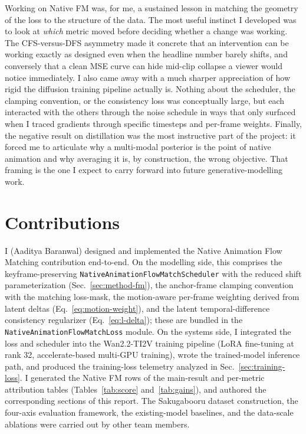 \documentclass[10pt,twocolumn]{article}
\begin{document}
Working on Native FM was, for me, a sustained lesson in matching the geometry of the loss to the structure of the data. The most useful instinct I developed was to look at \emph{which} metric moved before deciding whether a change was working. The CFS-versus-DFS asymmetry made it concrete that an intervention can be working exactly as designed even when the headline number barely shifts, and conversely that a clean MSE curve can hide mid-clip collapse a viewer would notice immediately. I also came away with a much sharper appreciation of how rigid the diffusion training pipeline actually is. Nothing about the scheduler, the clamping convention, or the consistency loss was conceptually large, but each interacted with the others through the noise schedule in ways that only surfaced when I traced gradients through specific timesteps and per-frame weights. Finally, the negative result on distillation was the most instructive part of the project: it forced me to articulate why a multi-modal posterior is the point of native animation and why averaging it is, by construction, the wrong objective. That framing is the one I expect to carry forward into future generative-modelling work.


\section{Contributions}

I (Aaditya Baranwal) designed and implemented the Native Animation Flow Matching contribution end-to-end. On the modelling side, this comprises the keyframe-preserving \texttt{NativeAnimationFlowMatchScheduler} with the reduced shift parameterization (Sec.~\ref{sec:method-fm}), the anchor-frame clamping convention with the matching loss-mask, the motion-aware per-frame weighting derived from latent deltas (Eq.~\ref{eq:motion-weight}), and the latent temporal-difference consistency regularizer (Eq.~\ref{eq:l-delta}); these are bundled in the \texttt{NativeAnimationFlowMatchLoss} module. On the systems side, I integrated the loss and scheduler into the Wan2.2-TI2V training pipeline (LoRA fine-tuning at rank 32, accelerate-based multi-GPU training), wrote the trained-model inference path, and produced the training-loss telemetry analyzed in Sec.~\ref{sec:training-loss}. I generated the Native FM rows of the main-result and per-metric attribution tables (Tables~\ref{tab:score} and~\ref{tab:gains}), and authored the corresponding sections of this report. The Sakugabooru dataset construction, the four-axis evaluation framework, the existing-model baselines, and the data-scale ablations were carried out by other team members.



\end{document}
